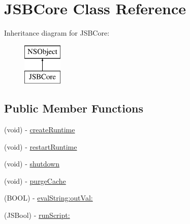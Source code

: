 \hypertarget{interface_j_s_b_core}{\section{J\-S\-B\-Core Class Reference}
\label{interface_j_s_b_core}
}
Inheritance diagram for J\-S\-B\-Core\-:\begin{figure}[H]
\begin{center}
\leavevmode
\includegraphics[height=2.000000cm]{interface_j_s_b_core}
\end{center}
\end{figure}
\subsection*{Public Member Functions}
\begin{DoxyCompactItemize}
\item 
(void) -\/ \hyperlink{interface_j_s_b_core_afbcc896c287ad29621f9a265dfae0a01}{create\-Runtime}
\item 
(void) -\/ \hyperlink{interface_j_s_b_core_a5ff187c93667b13def2cc751650b5f45}{restart\-Runtime}
\item 
(void) -\/ \hyperlink{interface_j_s_b_core_aba38b3995ddd9789fce361b3ea456f17}{shutdown}
\item 
(void) -\/ \hyperlink{interface_j_s_b_core_abf66b707fd7046f5a6ca3f4fe11053f6}{purge\-Cache}
\item 
(B\-O\-O\-L) -\/ \hyperlink{interface_j_s_b_core_a115ae6b034d1367fdeb63d76d13acb7a}{eval\-String\-:out\-Val\-:}
\item 
(J\-S\-Bool) -\/ \hyperlink{interface_j_s_b_core_aa5871a453904a0c133a30a837958ccad}{run\-Script\-:}
\end{DoxyCompactItemize}
